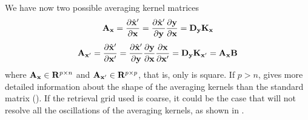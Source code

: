   We have now two possible averaging kernel matrices
  \begin{equation}
    \mathbf{A}_{\mathbf{x}} = \frac{\partial \hat{\mathbf{x}}'}{\partial \mathbf{x}} 
                         = \frac{\partial \hat{\mathbf{x}}'}{\partial \mathbf{y}} 
                           \frac{\partial \mathbf{y}}{\partial \mathbf{x}}
                         = \mathbf{D_y} \mathbf{K}_{\mathbf{x}}
  \end{equation}
  \begin{equation}
    \mathbf{A}_{\mathbf{x}'} = \frac{\partial \hat{\mathbf{x}}'}{\partial \mathbf{x}'} 
                          = \frac{\partial\hat{\mathbf{x}}'} 
                       {\partial\mathbf{y}}\frac{\partial\mathbf{y}}{\partial\mathbf{x}}
                            \frac{\partial\mathbf{x}}{\partial\mathbf{x}'}
                          = \mathbf{D_y} \mathbf{K}_{\mathbf{x}'}
                          = \mathbf{A}_{\mathbf{x}} \mathbf{B}
  \end{equation}
  where $\mathbf{A}_{\mathbf{x}} \in \mathbf{R}^{p \times n}$ and
  $\mathbf{A}_{\mathbf{x}'} \in \mathbf{R}^{p \times p}$, that is, only
   is square. If $p>n$, \aAvrKrnMtr{\SttVct}
  gives more detailed information about the shape of the averaging
  kernels than the standard matrix (). If the
  retrieval grid used is coarse, it could be the case that
   will not resolve all the oscillations of the
  averaging kernels, as shown in \citet[][Figure 11]{eriksson:99}.

  
  

    




